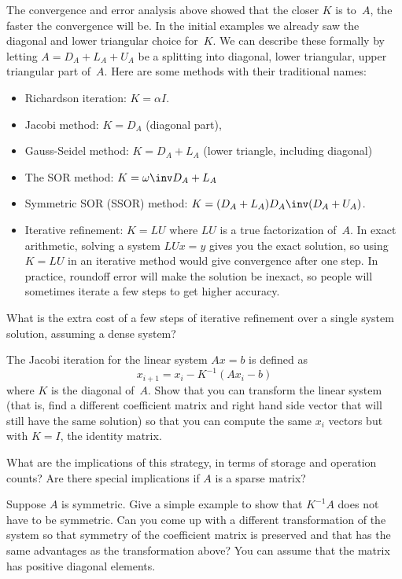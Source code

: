 The convergence and error analysis above showed that the closer $K$ is
to~$A$, the faster the  convergence will be.
%
In the initial examples we already saw the diagonal and lower
triangular choice for~$K$. We can describe these formally by letting
$A=D_A+L_A+U_A$ be a splitting into diagonal, lower triangular, upper
triangular part of~$A$. Here are some methods with their traditional names:
\begin{itemize}
\item Richardson iteration: $K=\alpha I$.
\item Jacobi method: $K=D_A$ (diagonal part),
\item Gauss-Seidel method: $K=D_A+L_A$ (lower triangle, including
  diagonal)
\item The \ac{SOR} method: $K=\omega\inv D_A+ L_A$
\item Symmetric SOR (SSOR) method: $K=(D_A+L_A)D_A\inv(D_A+U_A)$.
\item Iterative refinement: $K=LU$ where
  $LU$ is a true factorization of~$A$. In exact arithmetic, solving a
  system $LUx=y$ gives you the exact solution, so using $K=LU$ in an
  iterative method would give convergence after one step. In practice,
  roundoff error will make the solution be inexact, so people will
  sometimes iterate a few steps to get higher accuracy.
\end{itemize}
\begin{exercise}
  What is the extra cost of a few steps of iterative refinement over a
  single system solution, assuming a dense system?
\end{exercise}

\begin{exercise}
  The Jacobi iteration for the linear system $Ax=b$ is defined as
\[ x_{i+1}=x_i-K^{-1}(Ax_i-b) \]
where $K$ is the diagonal of~$A$. Show that you can transform the
linear system (that is, find a different coefficient matrix and right
hand side vector that will still have the same solution) so that you
can compute the same $x_i$ vectors but with $K=I$, the identity
matrix.

What are the implications of this strategy, in terms of storage and
operation counts? Are there special implications if $A$ is a sparse
matrix?

Suppose $A$ is symmetric. Give a simple example to show that $K^{-1}A$
does not have to be symmetric. Can you come up with a different
transformation of the system so that symmetry of the coefficient
matrix is preserved and that
has the same advantages as the transformation above? You can
assume that the matrix has positive diagonal elements.
\end{exercise}


